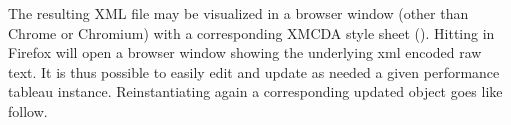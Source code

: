 \documentclass[a4paper,10pt,english]{sphinxhowto}
\begin{document}
\begin{sphinxVerbatim}[commandchars=\\\{\},numbers=left,firstnumber=1,stepnumber=1]
\end{sphinxVerbatim}

The resulting XML file may be visualized in a browser window (other than Chrome or Chromium)  with a corresponding XMCDA style sheet (). Hitting  in Firefox will open a browser window showing the underlying xml encoded raw text. It is thus possible to easily edit and update as needed a given performance tableau instance. Reinstantiating again a corresponding updated  object goes like follow.
\end{document}
